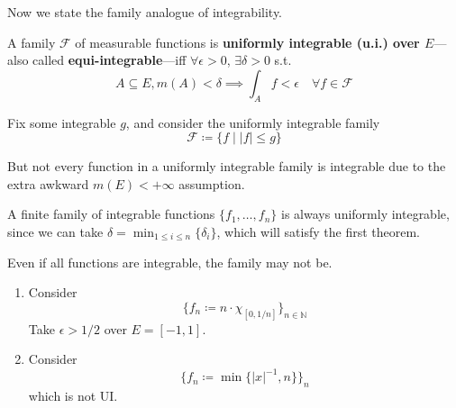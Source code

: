   Now we state the family analogue of integrability. 

  \begin{definition}
    A family $\mathscr{F}$ of measurable functions is \textbf{uniformly integrable (u.i.) over $E$}---also called \textbf{equi-integrable}---iff $\forall \epsilon > 0$, $\exists \delta > 0$ s.t. 
    \begin{equation}
      A \subseteq E, m(A) < \delta \implies \int_A f < \epsilon \quad \forall f \in \mathscr{F}
    \end{equation}
  \end{definition}

  \begin{example}
    Fix some integrable $g$, and consider the uniformly integrable family 
    \begin{equation}
      \mathscr{F} \coloneqq \{ f \mid |f| \leq g \}
    \end{equation}
  \end{example}

  But not every function in a uniformly integrable family is integrable due to the extra awkward $m(E) < +\infty$ assumption.  

  \begin{example}
    A finite family of integrable functions $\{f_1, \ldots, f_n\}$ is always uniformly integrable, since we can take $\delta = \min_{1 \leq i \leq n} \{\delta_i\}$, which will satisfy the first theorem. 
  \end{example}

  \begin{example}
    Even if all functions are integrable, the family may not be. 
    \begin{enumerate}
      \item Consider 
      \begin{equation}
        \{f_n \coloneqq n \cdot \chi_{[0, 1/n]}\}_{n \in \mathbb{N}} 
      \end{equation}
      Take $\epsilon > 1/2$ over $E = [-1, 1]$. 

      \item Consider 
      \begin{equation}
        \{f_n \coloneqq \min\{|x|^{-1}, n\} \}_n
      \end{equation}
      which is not UI. 
    \end{enumerate}
  \end{example}

